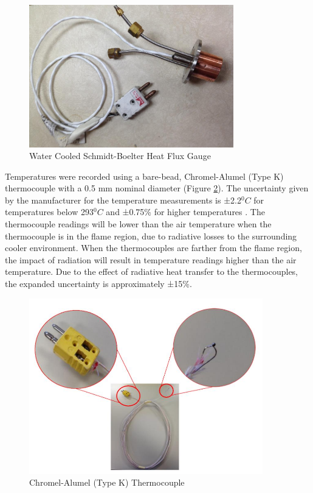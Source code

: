 \documentclass[12pt,oneside]{book}
\begin{document}
\begin{figure} [H]
	\centering
	\includegraphics[width = 3.5in]{0_Images/Instrumentation/Heat_Flux_Gauge.jpg}
	\caption{Water Cooled Schmidt-Boelter Heat Flux Gauge}
	\label{fig:HeatFluxGauge}
\end{figure}

Temperatures were recorded using a bare-bead, Chromel-Alumel (Type K) thermocouple with a 0.5 mm nominal diameter (Figure \ref{fig:Thermocouple}). The uncertainty given by the manufacturer for the temperature measurements is ±2.2$^0C$ for temperatures below 293$^0C$ and ±0.75\% for higher temperatures \cite{TemperatureHandbook}. The thermocouple readings will be lower than the air temperature when the thermocouple is in the flame region, due to radiative losses to the surrounding cooler environment. When the thermocouples are farther from the flame region, the impact of radiation will result in temperature readings higher than the air temperature. Due to the effect of radiative heat transfer to the thermocouples, the expanded uncertainty is approximately ±15\%.

\begin{figure} [H]
	\centering
	\includegraphics[width = 4in]{0_Images/Instrumentation/Thermocouple.jpg}
	\caption{Chromel-Alumel (Type K) Thermocouple}
	\label{fig:Thermocouple}
\end{figure}
\end{document}
